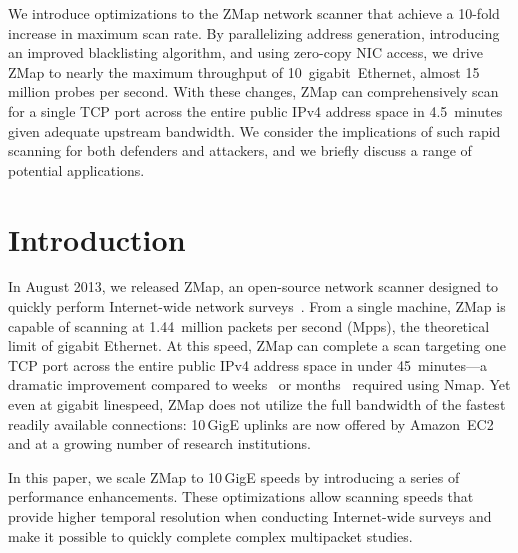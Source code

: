 
We introduce optimizations to the ZMap network scanner that achieve a 10-fold
increase in maximum scan rate. By parallelizing address generation,
introducing an improved blacklisting algorithm, and using zero-copy NIC
access, we drive ZMap to nearly the maximum throughput of
10~gigabit~Ethernet, almost 15 million probes per second. With these changes,
ZMap can comprehensively scan for a single TCP port across the entire public
IPv4 address space in 4.5~minutes given adequate upstream bandwidth. We
consider the implications of such rapid scanning for both defenders and
attackers, and we briefly discuss a range of potential
applications.

\section{Introduction}
\label{sec:introduction}

In August 2013, we released ZMap, an open-source network scanner designed to
quickly perform Internet-wide network surveys~\cite{zmap-2013}. From a single
machine, ZMap is capable of scanning at 1.44~million packets per second
(Mpps), the theoretical limit of gigabit Ethernet. At this speed, ZMap can
complete a scan targeting one TCP port across the entire public IPv4 address
space in under 45~minutes---a dramatic improvement compared to
weeks~\cite{zmap-2013} or months~\cite{ssl-observatory-2010} required using Nmap. Yet
even at gigabit linespeed, ZMap does not utilize the full bandwidth of the
fastest readily available connections: 10\,GigE uplinks are now offered by
Amazon~EC2~\cite{amazon-10g} and at a growing number of research
institutions. 

In this paper, we scale ZMap to 10\,GigE speeds by introducing a series of
performance enhancements. These optimizations allow scanning speeds that
provide higher temporal resolution when conducting Internet-wide surveys and
make it possible to quickly complete complex multipacket studies.


